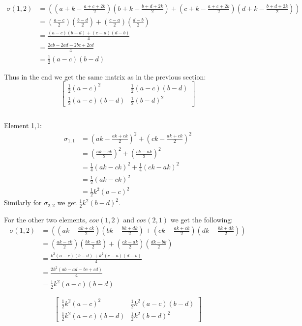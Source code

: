 \documentclass[10pt]{article}
\begin{document}
\begin{align}
\sigma(1,2) & = ((a+k-\frac{a+c+2k}{2})(b+k-\frac{b+d+2k}{2})+(c+k-\frac{a+c+2k}{2})(d+k-\frac{b+d+2k}{2})) \\
& = (\frac{a-c}{2}) (\frac{b-d}{2}) + (\frac{c-a}{2}) (\frac{d-b}{2}) \\
& = \frac{(a-c)(b-d) + (c-a)(d-b)}{4} \\
& = \frac{2ab - 2ad - 2bc + 2cd}{4} \\
& = \frac{1}{2} (a-c)(b-d)
\end{align}

Thus in the end we get the same matrix as in the previous section:
\begin{equation}
    \begin{bmatrix}
      \frac{1}{2}(a-c)^2 & \frac{1}{2} (a-c)(b-d)\\
      \frac{1}{2} (a-c)(b-d) & \frac{1}{2}(b-d)^2
    \end{bmatrix}
\end{equation}

\subsection{}
Element 1,1:
\begin{align}
\sigma_{1,1} & = (ak-\frac{ak+ck}{2})^2+(ck-\frac{ak+ck}{2})^2 \\
& = (\frac{ak-ck}{2})^2 + (\frac{ck-ak}{2})^2 \\
& = \frac{1}{4}(ak-ck)^2 + \frac{1}{4}(ck-ak)^2 \\
& = \frac{1}{2}(ak-ck)^2 \\
& = \frac{1}{2}k^2(a-c)^2
\end{align}
Similarly for $\sigma_{2,2}$ we get $\frac{1}{2}k^2(b-d)^2$.

For the other two elements, $cov(1,2)$ and $cov(2,1)$ we get the following:
\begin{align}
\sigma(1,2) & = ((ak-\frac{ak+ck}{2})(bk-\frac{bk+dk}{2})+(ck-\frac{ak+ck}{2})(dk-\frac{bk+dk}{2})) \\
& = (\frac{ak-ck}{2}) (\frac{bk-dk}{2}) + (\frac{ck-ak}{2}) (\frac{dk-bk}{2}) \\
& = \frac{k^2(a-c)(b-d) + k^2(c-a)(d-b)}{4} \\
& = \frac{2k^2(ab - ad - bc + cd)}{4} \\
& = \frac{1}{2}k^2 (a-c)(b-d)
\end{align}

\begin{equation}
    \begin{bmatrix}
      \frac{1}{2}k^2(a-c)^2 & \frac{1}{2}k^2(a-c)(b-d)\\
      \frac{1}{2}k^2(a-c)(b-d) & \frac{1}{2}k^2(b-d)^2
    \end{bmatrix}
\end{equation}
\end{document}
